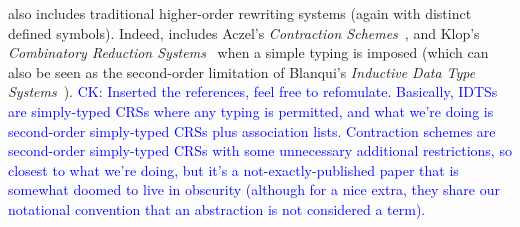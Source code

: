 \documentclass[letterpaper,11pt]{article}
\newcommand{\CK}[1]{\textcolor{blue}{CK: #1}}
\newcommand{\KR}[1]{\textcolor{red}{KR: #1}}
\begin{document}
\hax also includes traditional higher-order rewriting systems (again with distinct defined symbols).
Indeed, \hax includes
Aczel's \emph{Contraction Schemes}~\cite{Aczel:1978}, and Klop's \emph{Combinatory
Reduction Systems}~\cite{Klop+:tcs1993} when a simple typing is imposed (which can also
be seen as the second-order limitation of Blanqui's \emph{Inductive Data Type
Systems}~\cite{BlanquiJouannaudOkada:tcs2002}).
\CK{Inserted the references, feel free to refomulate.  Basically, IDTSs are
simply-typed CRSs where any typing is permitted, and what we're doing is
second-order simply-typed CRSs plus association lists.  Contraction schemes are
second-order simply-typed CRSs with some unnecessary additional restrictions, so
closest to what we're doing, but it's a not-exactly-published paper that is
somewhat doomed to live in obscurity (although for a nice extra, they share our
notational convention that an abstraction is not considered a term).}
\end{document}
